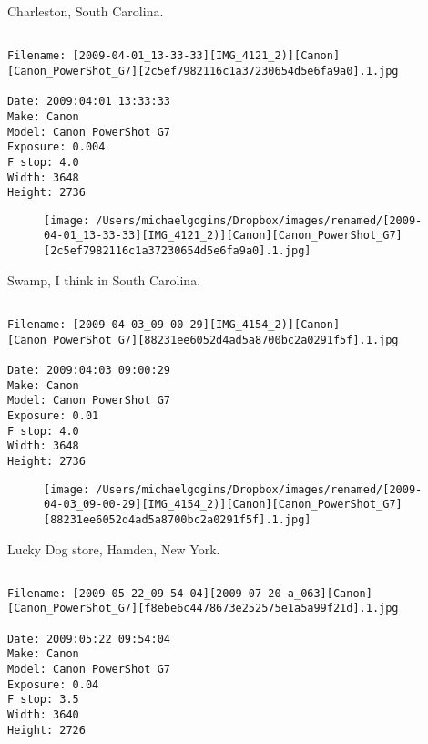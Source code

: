 \clearpage
\onecolumn
\noindent Charleston, South Carolina.
\noindent
\begin{lstlisting}

Filename: [2009-04-01_13-33-33][IMG_4121_2)][Canon][Canon_PowerShot_G7][2c5ef7982116c1a37230654d5e6fa9a0].1.jpg

Date: 2009:04:01 13:33:33
Make: Canon
Model: Canon PowerShot G7
Exposure: 0.004
F stop: 4.0
Width: 3648
Height: 2736
\end{lstlisting}
\clearpage

\begin{figure}
\texttt{[image: /Users/michaelgogins/Dropbox/images/renamed/[2009-04-01\_13-33-33][IMG\_4121\_2)][Canon][Canon\_PowerShot\_G7][2c5ef7982116c1a37230654d5e6fa9a0].1.jpg]}
\end{figure}
    
\clearpage
\onecolumn
\noindent Swamp, I think in South Carolina.
\noindent
\begin{lstlisting}

Filename: [2009-04-03_09-00-29][IMG_4154_2)][Canon][Canon_PowerShot_G7][88231ee6052d4ad5a8700bc2a0291f5f].1.jpg

Date: 2009:04:03 09:00:29
Make: Canon
Model: Canon PowerShot G7
Exposure: 0.01
F stop: 4.0
Width: 3648
Height: 2736
\end{lstlisting}
\clearpage

\begin{figure}
\texttt{[image: /Users/michaelgogins/Dropbox/images/renamed/[2009-04-03\_09-00-29][IMG\_4154\_2)][Canon][Canon\_PowerShot\_G7][88231ee6052d4ad5a8700bc2a0291f5f].1.jpg]}
\end{figure}
    
\clearpage
\onecolumn
\noindent Lucky Dog store, Hamden, New York.
\noindent
\begin{lstlisting}

Filename: [2009-05-22_09-54-04][2009-07-20-a_063][Canon][Canon_PowerShot_G7][f8ebe6c4478673e252575e1a5a99f21d].1.jpg

Date: 2009:05:22 09:54:04
Make: Canon
Model: Canon PowerShot G7
Exposure: 0.04
F stop: 3.5
Width: 3640
Height: 2726
\end{lstlisting}
\clearpage

